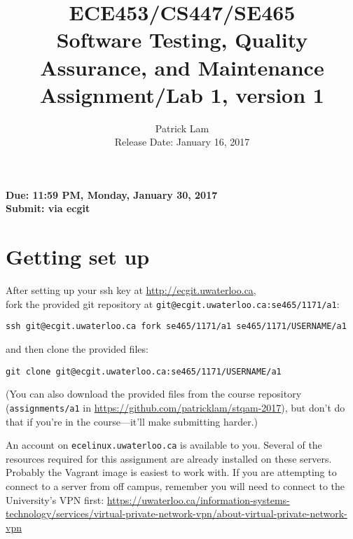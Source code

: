 \documentclass[10pt,hidelinks]{article}
\begin{document}
\title{
ECE453/CS447/SE465 \\
Software Testing, Quality Assurance, and Maintenance\\
Assignment/Lab 1, version 1}
\author{Patrick Lam \\
{Release Date:  January 16, 2017} \\
}
\renewcommand{\today}{}
\maketitle

\begin{center}

{\bf Due:  11:59 PM, Monday, January 30, 2017} \\
{\bf Submit: via ecgit }\\
\end{center}



\section*{Getting set up}
After setting up your ssh key at \url{http://ecgit.uwaterloo.ca}, \\ fork the provided git repository at {\tt git@ecgit.uwaterloo.ca:se465/1171/a1}:

\begin{center}
{\tt ssh git@ecgit.uwaterloo.ca fork se465/1171/a1 se465/1171/USERNAME/a1}
\end{center}

\noindent and then clone the provided files:

\begin{center}
{\tt git clone git@ecgit.uwaterloo.ca:se465/1171/USERNAME/a1}
\end{center}

(You can also download the provided
files from the course repository ({\tt assignments/a1} in \url{https://github.com/patricklam/stqam-2017}),
but don't do that if you're in the course---it'll make submitting harder.)

An account on {\tt ecelinux.uwaterloo.ca} is available to you.
Several of the resources required for this assignment are already installed on these servers. Probably the Vagrant image is easiest to work with.
If you are attempting to connect to a server from off campus, remember you will need to connect to the University's VPN first: \url{https://uwaterloo.ca/information-systems-technology/services/virtual-private-network-vpn/about-virtual-private-network-vpn}
\end{document}
